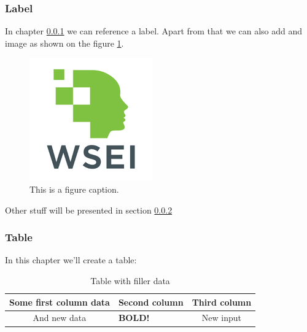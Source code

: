 \subsubsection{Label}
\label{label:label_title} %

In chapter \ref{label:label_title} we can reference a label. Apart from that we can also add and image as shown on the figure \ref{fig:example_figure}.
    
\begin{figure}[h] %
    \centering
    \includegraphics[scale=0.75]{Images/WSEI-Logo.png} %
    \caption[Short text]{This is a figure caption.} %
    \label{fig:example_figure} %
\end{figure}

Other stuff will be presented in section \ref{label:table_title}

\subsubsection{Table}
\label{label:table_title}

In this chapter we'll create a table:
\begin{table}[h] %
    \centering
    \begin{tabular}{|c|l||c|} %
        \hline %
        Some first column data & Second column & Third column \\ \hline \hline
        And new data & \textbf{BOLD!} & New input \\ %
        \hline
    \end{tabular}
    \caption[First table.]{Table with filler data} %
    \label{tab:first_table} %
\end{table}

